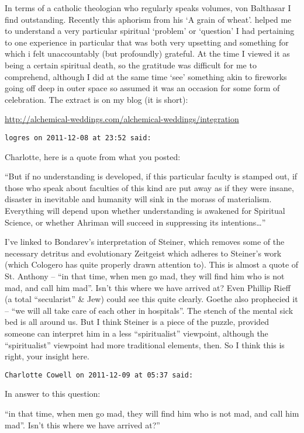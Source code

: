 \begin{footnotesize}
\begin{sffamily}
In terms of a catholic theologian who regularly speaks volumes, von Balthasar I find outstanding. Recently this aphorism from his `A grain of wheat'. helped me to understand a very particular spiritual `problem' or `question' I had pertaining to one experience in particular that was both very upsetting and something for which i felt unaccountably (but profoundly) grateful. At the time I viewed it as being a certain spiritual death, so the gratitude was difficult for me to comprehend, although I did at the same time `see' something akin to fireworks going off deep in outer space so assumed it was an occasion for some form of celebration. The extract is on my blog (it is short):

\url{http://alchemical-weddings.com/alchemical-weddings/integration}


\hfill

\texttt{logres on 2011-12-08 at 23:52 said: }

Charlotte, here is a quote from what you posted:

``But if no understanding is developed, if this particular faculty is stamped out, if those who speak about faculties of this kind are put away as if they were insane, disaster in inevitable and humanity will sink in the morass of materialism. Everything will depend upon whether understanding is awakened for Spiritual Science, or whether Ahriman will succeed in suppressing its intentions…''

I've linked to Bondarev's interpretation of Steiner, which removes some of the necessary detritus and evolutionary Zeitgeist which adheres to Steiner's work (which Cologero has quite properly drawn attention to). This is almost a quote of St. Anthony – ``in that time, when men go mad, they will find him who is not mad, and call him mad''. Isn't this where we have arrived at? Even Phillip Rieff (a total ``secularist'' \& Jew) could see this quite clearly. Goethe also prophecied it – ``we will all take care of each other in hospitals''. The stench of the mental sick bed is all around us. But I think Steiner is a piece of the puzzle, provided someone can interpret him in a less ``spiritualist'' viewpoint, although the ``spiritualist'' viewpoint had more traditional elements, then. So I think this is right, your insight here.


\hfill

\texttt{Charlotte Cowell on 2011-12-09 at 05:37 said: }

In answer to this question:

``in that time, when men go mad, they will find him who is not mad, and call him mad''. Isn't this where we have arrived at?''


\end{sffamily}
\end{footnotesize}
